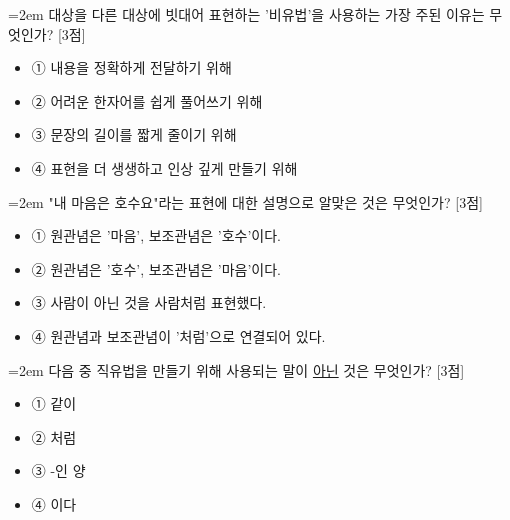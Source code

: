 \documentclass[10pt,a4paper]{article}
\newcommand{\qnum}[1]{%
  \tikz[baseline=(num.base)]{%
    \node[circle, fill=numCircle, text=white, inner sep=0pt,
          minimum size=18pt, font=\small\bfseries] (num) {#1};%
  }%
}
\newcommand{\pts}[1]{%
  \hfill\textcolor{ptsBadge}{[#1점]}%
}
\begin{document}
\vspace{3mm}
\begin{minipage}{\columnwidth}
{\hangindent=2em
\qnum{9}\enspace 대상을 다른 대상에 빗대어 표현하는 '비유법'을 사용하는 가장 주된 이유는 무엇인가? \pts{3}
\par}

\vspace{3mm}
\begin{itemize}[leftmargin=2.5em, labelsep=0.3em, label={}, itemsep=4pt, parsep=1pt, topsep=0pt]
  \item ① 내용을 정확하게 전달하기 위해
  \item ② 어려운 한자어를 쉽게 풀어쓰기 위해
  \item ③ 문장의 길이를 짧게 줄이기 위해
  \item ④ 표현을 더 생생하고 인상 깊게 만들기 위해
\end{itemize}
\end{minipage}
\vspace{4mm}

\vspace{4mm}
\begin{minipage}{\columnwidth}
{\hangindent=2em
\qnum{10}\enspace "내 마음은 호수요"라는 표현에 대한 설명으로 알맞은 것은 무엇인가? \pts{3}
\par}

\vspace{3mm}
\begin{itemize}[leftmargin=2.5em, labelsep=0.3em, label={}, itemsep=4pt, parsep=1pt, topsep=0pt]
  \item ① 원관념은 '마음', 보조관념은 '호수'이다.
  \item ② 원관념은 '호수', 보조관념은 '마음'이다.
  \item ③ 사람이 아닌 것을 사람처럼 표현했다.
  \item ④ 원관념과 보조관념이 '처럼'으로 연결되어 있다.
\end{itemize}
\end{minipage}
\vspace{4mm}

\vspace{4mm}
\begin{minipage}{\columnwidth}
{\hangindent=2em
\qnum{11}\enspace 다음 중 직유법을 만들기 위해 사용되는 말이 \uline{아닌} 것은 무엇인가? \pts{3}
\par}

\vspace{3mm}
\begin{itemize}[leftmargin=2.5em, labelsep=0.3em, label={}, itemsep=4pt, parsep=1pt, topsep=0pt]
  \item ① 같이
  \item ② 처럼
  \item ③ -인 양
  \item ④ 이다
\end{itemize}
\end{minipage}
\vspace{4mm}
\end{document}

